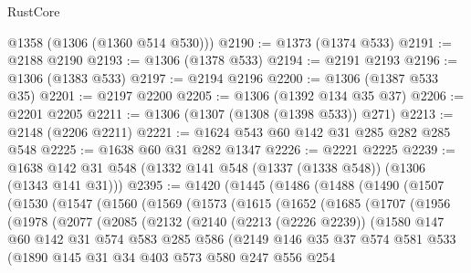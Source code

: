 \begin{lexlean}{RustCore}
\begin{coremodule}
      @1358
      (@1306 (@1360 @514 @530)))
@2190 := @1373 (@1374 @533)
@2191 := @2188 @2190
@2193 := @1306 (@1378 @533)
@2194 := @2191 @2193
@2196 := @1306 (@1383 @533)
@2197 := @2194 @2196
@2200 := @1306 (@1387 @533 @35)
@2201 := @2197 @2200
@2205 := @1306 (@1392 @134 @35 @37)
@2206 := @2201 @2205
@2211 := @1306 (@1307 (@1308 (@1398 @533)) @271)
@2213 := @2148 (@2206 @2211)
@2221 := @1624 @543 @60 @142 @31 @285 @282 @285 @548
@2225 := @1638 @60 @31 @282 @1347
@2226 := @2221 @2225
@2239 := @1638 @142 @31 @548 (@1332 @141 @548 (@1337 (@1338 @548)) (@1306 (@1343 @141 @31)))
@2395 := @1420
    (@1445
      (@1486
        (@1488
          (@1490
            (@1507
              (@1530
                (@1547
                  (@1560
                    (@1569
                      (@1573
                        (@1615
                          (@1652
                            (@1685
                              (@1707
                                (@1956
                                  (@1978
                                    (@2077
                                      (@2085
                                        (@2132
                                          (@2140
                                            (@2213 (@2226 @2239))
                                            (@1580
                                              @147
                                              @60
                                              @142
                                              @31
                                              @574
                                              @583
                                              @285
                                              @586
                                              (@2149
                                                @146
                                                @35
                                                @37
                                                @574
                                                @581
                                                @533
                                                (@1890
                                                  @145
                                                  @31
                                                  @34
                                                  @403
                                                  @573
                                                  @580
                                                  @247
                                                  @556
                                                  @254

\end{coremodule}
\end{lexlean}
